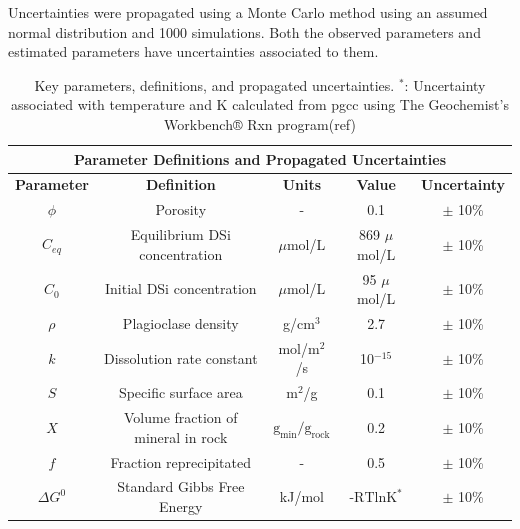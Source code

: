 Uncertainties were propagated using a Monte Carlo method using an assumed normal distribution and 1000 simulations. Both the observed parameters and estimated parameters have uncertainties associated to them.


\begin{table}[H]
    \centering
    \renewcommand{\arraystretch}{1.3} %
    {\small
    \begin{tabular}{|c|c|c|c|c|}
        \hline
        \multicolumn{5}{|c|}{\textbf{Parameter Definitions and Propagated Uncertainties}} \\  
        \hline
        \textbf{Parameter} & \textbf{Definition} & \textbf{Units} & \textbf{Value} & \textbf{Uncertainty} \\  
        \hline
        $\phi$ & Porosity & - & 0.1 & $\pm$ 10\% \\  
        $C_{eq}$ & Equilibrium DSi concentration & $\mu$mol/L & 869 $\mu$mol/L & $\pm$ 10\% \\  
        $C_0$ & Initial DSi concentration & $\mu$mol/L & 95 $\mu$mol/L & $\pm$ 10\% \\  
        $\rho$ & Plagioclase density & g/cm$^3$ & 2.7 & $\pm$ 10\% \\  
        $k$ & Dissolution rate constant & mol/m$^2$/s & 10$^{-15}$ & $\pm$ 10\% \\  
        $S$ & Specific surface area & m$^2$/g & 0.1 & $\pm$ 10\% \\  
        $X$ & Volume fraction of mineral in rock & $\text{g}_{\text{min}}/\text{g}_{\text{rock}}$ & 0.2 & $\pm$ 10\% \\   
        $f$ & Fraction reprecipitated & - & 0.5 & $\pm$ 10\% \\
        $\Delta G^0$ & Standard Gibbs Free Energy & kJ/mol & $\text{-RTlnK}^*$ & $\pm$ 10\% \\
        \hline
    \end{tabular}}
    \caption{Key parameters, definitions, and propagated uncertainties. $^*$: Uncertainty associated with temperature and K calculated from pgcc using The Geochemist's Workbench® Rxn program(ref)}
    \label{tab:montecarlo}
\end{table}

\FloatBarrier




